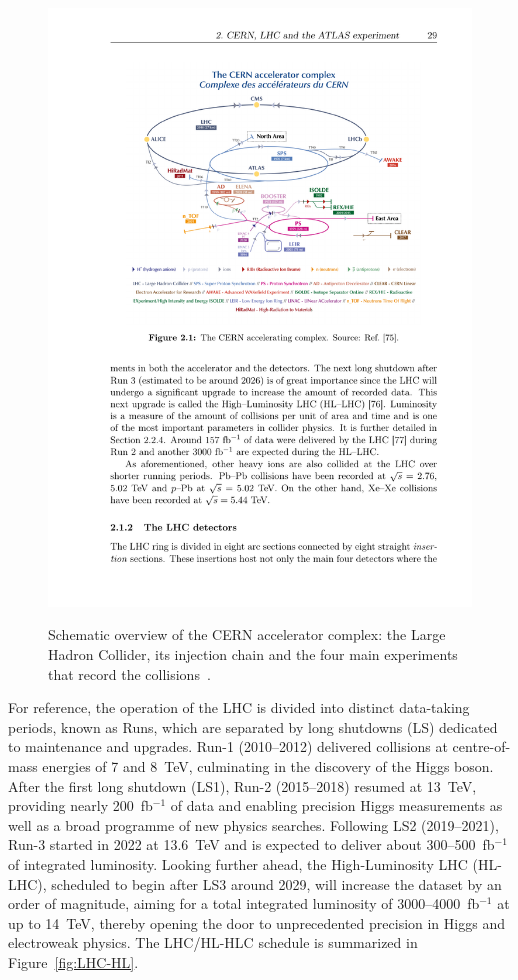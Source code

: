 \begin{figure}[htbp]
    \centering
    \includegraphics[width=1\linewidth]{images/CCC-v2022}\\
    \caption{Schematic overview of the CERN accelerator complex: the Large Hadron Collider, its injection chain and the four main experiments that record the collisions~\cite{Lopienska:2800984}.}
    \label{LHC:chain}
\end{figure}

For reference, the operation of the LHC is divided into distinct data-taking periods, known as Runs, which are separated by long shutdowns (LS) dedicated to maintenance and upgrades. Run-1 (2010--2012) delivered collisions at centre-of-mass energies of 7 and 8~TeV, culminating in the discovery of the Higgs boson. After the first long shutdown (LS1), Run-2 (2015--2018) resumed at 13~TeV, providing nearly 200~fb$^{-1}$ of data and enabling precision Higgs measurements as well as a broad programme of new physics searches. Following LS2 (2019--2021), Run-3 started in 2022 at 13.6~TeV and is expected to deliver about 300--500~fb$^{-1}$ of integrated luminosity. Looking further ahead, the High-Luminosity LHC (HL-LHC), scheduled to begin after LS3 around 2029, will increase the dataset by an order of magnitude, aiming for a total integrated luminosity of 3000--4000~fb$^{-1}$ at up to 14~TeV, thereby opening the door to unprecedented precision in Higgs and electroweak physics. The LHC/HL-HLC schedule is summarized in Figure~\ref{fig:LHC-HL}.

